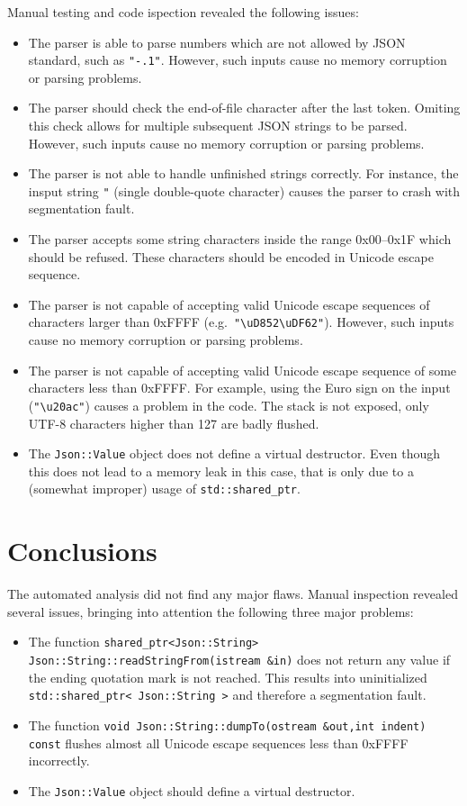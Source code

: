 \documentclass[11pt]{article}
\begin{document}
Manual testing and code ispection revealed the following issues:
\begin{itemize}[itemsep=0pt]
\item The parser is able to parse numbers which are not allowed by JSON standard, such as \texttt{"-.1"}. However, such inputs cause no memory corruption or parsing problems.
\item The parser should check the end-of-file character after the last token. Omiting this check allows for multiple subsequent JSON strings to be parsed. However, such inputs cause no memory corruption or parsing problems.
\item The parser is not able to handle unfinished strings correctly. For instance, the insput string \texttt{"} (single double-quote character) causes the parser to crash with segmentation fault.
\item The parser accepts some string characters inside the range 0x00--0x1F which should be refused. These characters should be encoded in Unicode escape sequence.
\item The parser is not capable of accepting valid Unicode escape sequences of characters larger than 0xFFFF (e.g.\ \texttt{"\textbackslash{}uD852\textbackslash{}uDF62"}). However, such inputs cause no memory corruption or parsing problems.
\item The parser is not capable of accepting valid Unicode escape sequence of some characters less than 0xFFFF. For example, using the Euro sign on the input (\texttt{"\textbackslash{}u20ac"}) causes a problem in the code. The stack is not exposed, only UTF-8 characters higher than 127 are badly flushed.
\item The \texttt{Json::Value} object does not define a virtual destructor. Even though this does not lead to a memory leak in this case, that is only due to a (somewhat improper) usage of \texttt{std::shared\_ptr}.
\end{itemize}

\section{Conclusions}

The automated analysis did not find any major flaws. Manual inspection revealed several issues, bringing into attention the following three major problems:
\begin{itemize}[itemsep=0pt]
\item The function \texttt{shared\_ptr<Json::String> Json::String::readStringFrom(istream \&in)} does not return any value if the ending quotation mark is not reached. This results into uninitialized \texttt{std::shared\_ptr< Json::String >} and therefore a segmentation fault.
\item The function \texttt{void Json::String::dumpTo(ostream \&out,int indent) const} flushes almost all Unicode escape sequences less than 0xFFFF incorrectly.
\item The \texttt{Json::Value} object should define a virtual destructor.
\end{itemize}
\end{document}
